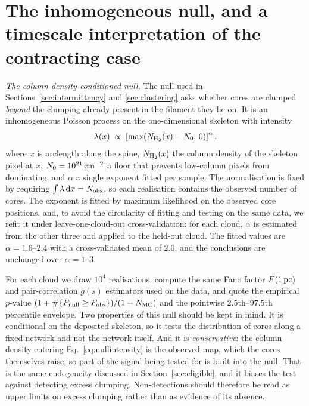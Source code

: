 \documentclass[usenatbib,twoside,twocolumn]{mnras}
\begin{document}
\section{The inhomogeneous null, and a timescale interpretation of the contracting case}
\label{sec:nullspec}

\emph{The column-density-conditioned null.} The null used in Sections~\ref{sec:intermittency} and \ref{sec:clustering} asks whether cores are clumped \emph{beyond} the clumping already present in the filament they lie on. It is an inhomogeneous Poisson process on the one-dimensional skeleton with intensity
\begin{equation}
\lambda(x)\;\propto\;\left[\max\!\left(N_{\rm H_2}(x)-N_0,\,0\right)\right]^{\alpha},
\label{eq:nullintensity}
\end{equation}
where $x$ is arclength along the spine, $N_{\rm H_2}(x)$ the column density of the skeleton pixel at $x$, $N_0=10^{21}\,{\rm cm^{-2}}$ a floor that prevents low-column pixels from dominating, and $\alpha$ a single exponent fitted per sample. The normalisation is fixed by requiring $\int\lambda\,{\rm d}x=N_{\rm obs}$, so each realisation contains the observed number of cores. The exponent is fitted by maximum likelihood on the observed core positions, and, to avoid the circularity of fitting and testing on the same data, we refit it under leave-one-cloud-out cross-validation: for each cloud, $\alpha$ is estimated from the other three and applied to the held-out cloud. The fitted values are $\alpha=1.6$--$2.4$ with a cross-validated mean of $2.0$, and the conclusions are unchanged over $\alpha=1$--$3$.

For each cloud we draw $10^4$ realisations, compute the same Fano factor $F(1\,{\rm pc})$ and pair-correlation $g(s)$ estimators used on the data, and quote the empirical $p$-value $(1+\#\{F_{\rm null}\geq F_{\rm obs}\})/(1+N_{\rm MC})$ and the pointwise $2.5$th--$97.5$th percentile envelope. Two properties of this null should be kept in mind. It is conditional on the deposited skeleton, so it tests the distribution of cores along a fixed network and not the network itself. And it is \emph{conservative}: the column density entering Eq.~\ref{eq:nullintensity} is the observed map, which the cores themselves raise, so part of the signal being tested for is built into the null. That is the same endogeneity discussed in Section~\ref{sec:eligible}, and it biases the test against detecting excess clumping. Non-detections should therefore be read as upper limits on excess clumping rather than as evidence of its absence.
\end{document}
